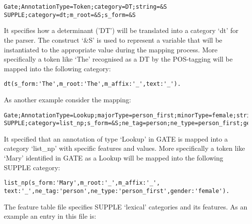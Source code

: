 \begin{small}\begin{verbatim}
Gate;AnnotationType=Token;category=DT;string=&S
SUPPLE;category=dt;m_root=&S;s_form=&S
\end{verbatim}\end{small}


It specifies how a determinant ('DT') will be translated into a category `dt'
for the parser. The construct `\&S' is used to represent a variable that will be
instantiated to the appropriate value during the mapping process. More
specifically a token like `The' recognised as a DT by the POS-tagging will be
mapped into the following category:

\begin{small}\begin{verbatim}
dt(s_form:'The',m_root:'The',m_affix:'_',text:'_').
\end{verbatim}\end{small}


As another example consider the mapping:

\begin{small}\begin{verbatim}
Gate;AnnotationType=Lookup;majorType=person_first;minorType=female;string=&S
SUPPLE;category=list_np;s_form=&S;ne_tag=person;ne_type=person_first;gender=female
\end{verbatim}\end{small}


It specified that an annotation of type `Lookup' in GATE is mapped into a
category `list\_np' with specific features and values. More specifically a token
like `Mary' identified in GATE as a Lookup will be mapped into the following
SUPPLE category:

\begin{small}\begin{verbatim}
list_np(s_form:'Mary',m_root:'_',m_affix:'_',
text:'_',ne_tag:'person',ne_type:'person_first',gender:'female').
\end{verbatim}\end{small}




The feature table file specifies SUPPLE `lexical' categories and its
features.  As an example an entry in this file is:

